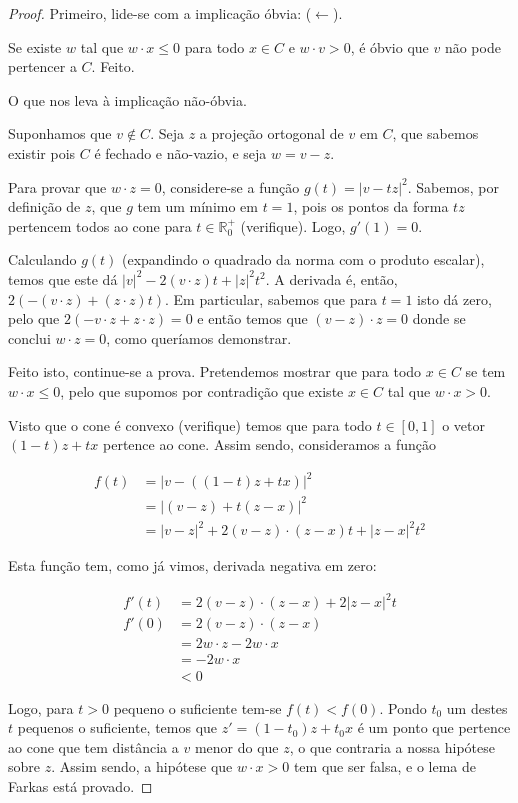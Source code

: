 \documentclass{article}
\newcommand{\R}{\mathbb{R}}
\theoremstyle{definition}
\begin{document}
	\begin{proof}
	Primeiro, lide-se com a implicação óbvia: ($\leftarrow$).
	
	Se existe $w$ tal que $w \cdot x \leq 0$ para todo $x \in C$ e $w \cdot v > 0$, é óbvio que $v$ não pode pertencer a $C$. Feito.
	
	O que nos leva à implicação não-óbvia.
	
	Suponhamos que $v \not \in C$. Seja $z$ a projeção ortogonal de $v$ em $C$, que sabemos existir pois $C$ é fechado e não-vazio, e seja $w = v - z$.
	
	Para provar que $w \cdot z = 0$, considere-se a função $g(t) = \lvert v - t z \rvert ^2$. Sabemos, por definição de $z$, que $g$ tem um mínimo em $t = 1$, pois os pontos da forma $tz$ pertencem todos ao cone para $t \in \R^+_0$ (verifique). Logo, $g'(1) = 0$.
	
	Calculando $g(t)$ (expandindo o quadrado da norma com o produto escalar), temos que este dá $\lvert v \rvert ^2 - 2 (v \cdot z) t + \lvert z \rvert ^2 t^2$. A derivada é, então, $2 (-(v \cdot z) + (z \cdot z) t)$. Em particular, sabemos que para $t = 1$ isto dá zero, pelo que $2 (-v \cdot z + z \cdot z) = 0$ e então temos que $(v - z) \cdot z = 0$ donde se conclui $w \cdot z = 0$, como queríamos demonstrar.
	
	Feito isto, continue-se a prova. Pretendemos mostrar que para todo $x \in C$ se tem $w \cdot x \leq 0$, pelo que supomos por contradição que existe $x \in C$ tal que $w \cdot x > 0$.
	
	Visto que o cone é convexo (verifique) temos que para todo $t \in [0,1]$ o vetor $(1-t)z + tx$ pertence ao cone. Assim sendo, consideramos a função
	
	
	\begin{align*}
	f(t) &= \lvert v - ((1-t)z + tx) \rvert^2 \\
	&= \lvert(v - z) + t(z - x)\rvert^2 \\
	&= \lvert v-z \rvert^2 + 2 (v - z) \cdot (z - x) t + \lvert z - x \rvert^2 t^2
	\end{align*}
	
	Esta função tem, como já vimos, derivada negativa em zero:
	
	
	\begin{align*}
	f'(t) &= 2 (v - z) \cdot (z - x) + 2 \lvert z - x \rvert^2 t \\
	f'(0) &= 2 (v - z) \cdot (z - x)\\
	&= 2 w \cdot z - 2 w \cdot x\\
	&= - 2 w \cdot x\\
	&< 0
	\end{align*}
	
	Logo, para $t>0$ pequeno o suficiente tem-se $f(t) < f(0)$. Pondo $t_0$ um destes $t$ pequenos o suficiente, temos que $z' = (1-t_0)z + t_0 x$ é um ponto que pertence ao cone que tem distância a $v$ menor do que $z$, o que contraria a nossa hipótese sobre $z$. Assim sendo, a hipótese que $w \cdot x > 0$ tem que ser falsa, e o lema de Farkas está provado.
	\end{proof}
	
\end{document}

